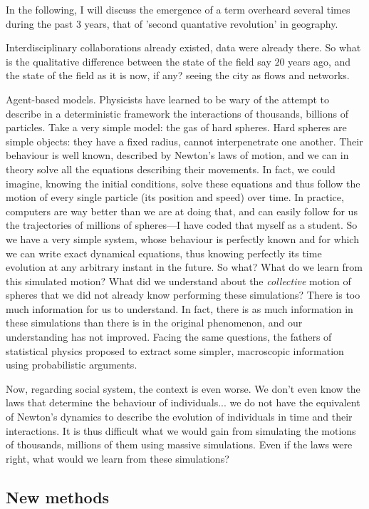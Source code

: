 In the following, I will discuss the emergence of a term overheard several times
during the past $3$ years, that of 'second quantative revolution' in geography.


Interdisciplinary collaborations already existed, data were already there. So
what is the qualitative difference between the state of the field say $20$ years
ago, and the state of the field as it is now, if any?\cite{Batty:2008,Batty:2012,Batty:2013} seeing the city as flows and networks.


Agent-based models. Physicists have learned to be wary of the attempt to
describe in a deterministic framework the interactions of thousands, billions of
particles. Take a very simple model: the gas of hard spheres. Hard spheres are
simple objects: they have a fixed radius, cannot interpenetrate one another.
Their behaviour is well known, described by Newton's laws of motion, and we can
in theory solve all the equations describing their movements. In fact, we could
imagine, knowing the initial conditions, solve these equations and thus follow
the motion of every single particle (its position and speed) over time. In
practice, computers are way better than we are at doing that, and can easily follow for
us the trajectories of millions of spheres---I have coded that myself as a
student. So we have a very simple system, whose behaviour is perfectly known and
for which we can write exact dynamical equations, thus knowing perfectly its
time evolution at any arbitrary instant in the future. So what? What do we learn
from this simulated motion? What did we understand about the \emph{collective}
motion of spheres that we did not already know performing these simulations?
There is too much information for us to understand. In fact, there is as much
information in these simulations than there is in the original phenomenon, and
our understanding has not improved.
Facing the same questions, the fathers of statistical physics proposed to
extract some simpler, macroscopic information using probabilistic arguments.

Now, regarding social system, the context is even worse. We don't even know the
laws that determine the behaviour of individuals... we do not have the
equivalent of Newton's dynamics to describe the evolution of individuals in time
and their interactions. It is thus difficult what we would gain from simulating
the motions of thousands, millions of them using massive simulations. Even if
the laws were right, what would we learn from these simulations?

    \subsection{New methods}
    \label{sub:new_methods}

